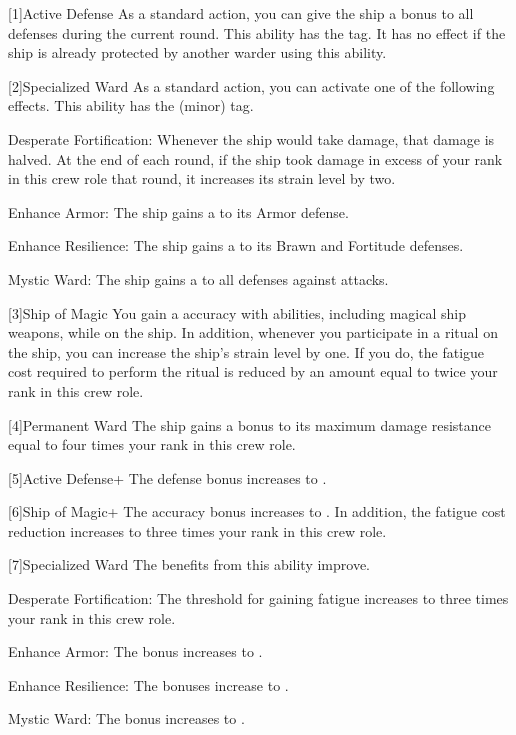     [1]{Active Defense} As a standard action, you can give the ship a  bonus to all defenses during the current round.
      This ability has the  tag.
      It has no effect if the ship is already protected by another warder using this ability.

    [2]{Specialized Ward} As a standard action, you can activate one of the following effects.
      This ability has the  (minor) tag.
      \begin{raggeditemize}
        \item Desperate Fortification: Whenever the ship would take damage, that damage is halved.
          At the end of each round, if the ship took damage in excess of your rank in this crew role that round, it increases its strain level by two.
        \item Enhance Armor: The ship gains a   to its Armor defense.
        \item Enhance Resilience: The ship gains a   to its Brawn and Fortitude defenses.
        \item Mystic Ward: The ship gains a   to all defenses against \magical attacks.
      \end{raggeditemize}

    [3]{Ship of Magic} You gain a  accuracy with \magical abilities, including magical ship weapons, while on the ship.
      In addition, whenever you participate in a ritual on the ship, you can increase the ship's strain level by one.
      If you do, the fatigue cost required to perform the ritual is reduced by an amount equal to twice your rank in this crew role.

    [4]{Permanent Ward} The ship gains a bonus to its maximum damage resistance equal to four times your rank in this crew role.

    [5]{Active Defense+} The defense bonus increases to .

    [6]{Ship of Magic+} The accuracy bonus increases to .
      In addition, the fatigue cost reduction increases to three times your rank in this crew role.

    [7]{Specialized Ward} The benefits from this ability improve.
      \begin{raggeditemize}
        \item Desperate Fortification: The threshold for gaining fatigue increases to three times your rank in this crew role.
        \item Enhance Armor: The bonus increases to .
        \item Enhance Resilience: The bonuses increase to .
        \item Mystic Ward: The bonus increases to .
      \end{raggeditemize}
